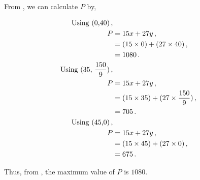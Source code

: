 \begin{subquestions}


\subquestion

From , we can calculate $P$ by,

\begin{align}
	\text{Using (0,40)} \,, \nonumber \\
	P & = 15x + 27y \,, \nonumber \\
	  & = (15 \times 0) + (27 \times 40) \,, \nonumber \\
	  & = 1080 \,. \label{2008:q1:eqn:Profit} \\
	\text{Using (35, $\frac{150}{9})$} \,, \nonumber \\
	P & = 15x + 27y \,, \nonumber \\
	  & = (15 \times 35) + (27 \times \frac{150}{9}) \,, \nonumber \\
	  & = 705 \,.    \\		  
	\text{Using (45,0)} \,, \nonumber \\
	P & = 15x + 27y \,, \nonumber \\
	  & = (15 \times 45) + (27 \times 0) \,, \nonumber \\
	  & = 675 \,. 
\end{align}

Thus, from , the maximum value of $P$ is $1080$.

\end{subquestions}

